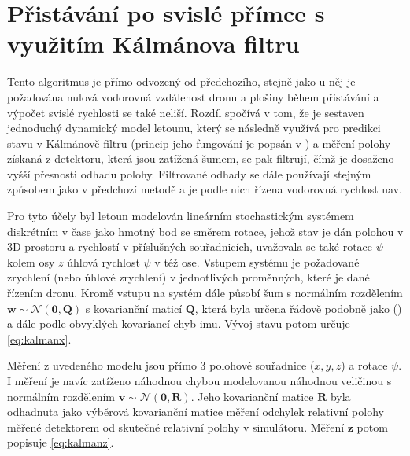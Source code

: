    \section{Přistávání po svislé přímce s využitím Kálmánova filtru} \label{sec:kalmanoffboardpid}
        Tento algoritmus je přímo odvozený od předchozího, stejně jako u něj je požadována nulová vodorovná vzdálenost dronu a plošiny během přistávání a výpočet svislé rychlosti se také neliší. Rozdíl spočívá v tom, že je sestaven jednoduchý dynamický model letounu, který se následně využívá pro predikci stavu v Kálmánově filtru (princip jeho fungování je popsán v ) a měření polohy získaná z detektoru, která jsou zatížená šumem, se pak filtrují, čímž je dosaženo vyšší přesnosti odhadu polohy. Filtrované odhady se dále používají stejným způsobem jako v předchozí metodě a je podle nich řízena vodorovná rychlost \acrshort{uav}.

        Pro tyto účely byl letoun modelován lineárním stochastickým systémem diskrétním v čase jako hmotný bod se směrem rotace, jehož stav je dán polohou v 3D prostoru a rychlostí v příslušných souřadnicích, uvažovala se také rotace $\psi$ kolem osy $z$ úhlová rychlost $\dot \psi$ v též ose. Vstupem systému je požadované zrychlení (nebo úhlové zrychlení) v jednotlivých proměnných, které je dané řízením dronu. Kromě vstupu na systém dále působí šum s normálním rozdělením $\mathbf{w} \sim \mathcal{N}(\mathbf{0},\mathbf{Q})$ s kovarianční maticí $\mathbf{Q}$, která byla určena řádově podobně jako \citeauthor{Kojima2015} (\citeyear{Kojima2015}) a dále podle obvyklých kovariancí chyb \acrshort{imu}. %
        Vývoj stavu potom určuje \cref{eq:kalmanx}.

        Měření z uvedeného modelu jsou přímo 3 polohové souřadnice ($x, y, z$) a rotace $\psi$. I měření je navíc zatíženo náhodnou chybou modelovanou náhodnou veličinou s normálním rozdělením $\mathbf{v} \sim \mathcal{N}(\mathbf{0},\mathbf{R})$. Jeho kovarianční matice $\mathbf{R}$ byla odhadnuta jako výběrová kovarianční matice měření odchylek relativní polohy měřené detektorem od skutečné relativní polohy v simulátoru. Měření $\mathbf z$ potom popisuje \cref{eq:kalmanz}.

